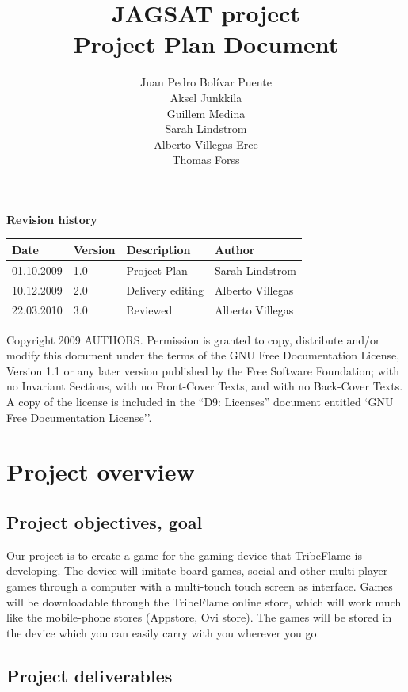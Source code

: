 \documentclass[12pt,a4paper]{article}
\title{\large JAGSAT project\\\huge Project Plan Document}
\author{
  Juan Pedro Bolívar Puente\\ 
  Aksel Junkkila\\
  Guillem Medina\\ 
  Sarah Lindstrom\\ 
  Alberto Villegas Erce\\ 
  Thomas Forss
}
\begin{document}
\maketitle

\begin{center}
\textbf {Revision history}

\begin{tabular}{ l | l | l | l }
Date			&Version	&Description		&Author\\\hline\hline
01.10.2009	&1.0		&Project Plan 		&Sarah Lindstrom\\
10.12.2009	&2.0		&Delivery editing	&Alberto Villegas\\
22.03.2010	&3.0		&Reviewed		&Alberto Villegas
\end{tabular}
\label{tab:rev}
\end{center}

\vfill
Copyright 2009 AUTHORS.
Permission is granted to copy, distribute and/or modify this document under the terms of the GNU Free Documentation License, Version 1.1 or any later version published by the Free Software Foundation;  with no Invariant Sections, with no Front-Cover Texts, and with no Back-Cover Texts. A copy of the license is included in the ``D9: Licenses''  document entitled `GNU Free Documentation License''.

\pagebreak
\tableofcontents
\pagebreak

\section{Project overview}

\subsection{Project objectives, goal}

Our project is to create a game for the gaming device that TribeFlame
is developing. The device will imitate board games, social and other
multi-player games through a computer with a multi-touch touch screen
as interface. Games will be downloadable through the TribeFlame online
store, which will work much like the mobile-phone stores (Appstore,
Ovi store). The games will be stored in the device which you can
easily carry with you wherever you go.

\subsection{Project deliverables}
\end{document}

